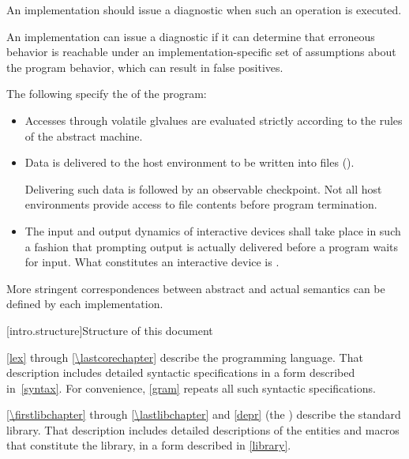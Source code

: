 \pnum
\recommended
An implementation should issue a diagnostic when such an operation is executed.
\begin{note}
An implementation can issue a diagnostic
if it can determine that erroneous behavior is reachable
under an implementation-specific set of assumptions about the program behavior,
which can result in false positives.
\end{note}

\pnum
{}%
The following specify the
of the program:
\begin{itemize}
\item
Accesses through volatile glvalues are evaluated strictly according to the
rules of the abstract machine.
\item
Data is delivered to the host environment to be written into files ().

\begin{note}
Delivering such data
is followed by an observable checkpoint.
Not all host environments provide access to file contents before program termination.
\end{note}

\item
The input and output dynamics of interactive devices shall take
place in such a fashion that prompting output is actually delivered before a program waits for input. What constitutes an interactive device is
.
\end{itemize}

\begin{note}
More stringent correspondences between abstract and actual
semantics can be defined by each implementation.
\end{note}
%

[intro.structure]{Structure of this document}

\pnum
{}%
%
\ref{lex} through \ref{\lastcorechapter} describe the \Cpp{} programming
language. That description includes detailed syntactic specifications in
a form described in~\ref{syntax}. For convenience, \ref{gram}
repeats all such syntactic specifications.

\pnum
\ref{\firstlibchapter} through \ref{\lastlibchapter} and \ref{depr}
(the ) describe the \Cpp{} standard library.
That description includes detailed descriptions of the
entities and macros
that constitute the library, in a form described in \ref{library}.

